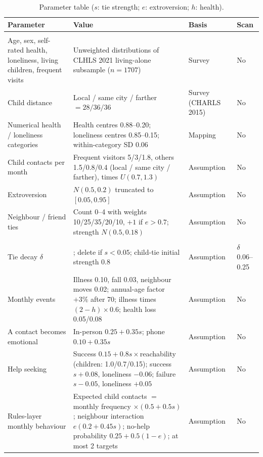 \documentclass[10pt,twocolumn]{article}
\begin{document}
\begin{table}[t]
\centering\footnotesize
\caption{Parameter table ($s$: tie strength; $e$: extroversion; $h$: health).}
\label{tab:params}
\setlength{\tabcolsep}{4pt}
\begin{tabular}{@{}>{\raggedright\arraybackslash}p{}>{\raggedright\arraybackslash}p{}>{\raggedright\arraybackslash}p{}>{\raggedright\arraybackslash}p{}@{}}
\toprule
Parameter & Value & Basis & Scan \\
\midrule
\multicolumn{4}{@{}l}{\textit{Profile generation}} \\
Age, sex, self-rated health, loneliness, living children, frequent visits & Unweighted distributions of CLHLS 2021 living-alone subsample ($n=1707$) & Survey & No \\
Child distance & Local / same city / farther $=28/36/36$ & Survey (CHARLS 2015) & No \\
Numerical health / loneliness categories & Health centres 0.88--0.20; loneliness centres 0.85--0.15; within-category SD 0.06 & Mapping & No \\
Child contacts per month & Frequent visitors 5/3/1.8, others 1.5/0.8/0.4 (local / same city / farther), times $U(0.7,1.3)$ & Assumption & No \\
Extroversion & $N(0.5,0.2)$ truncated to $[0.05,0.95]$ & Assumption & No \\
Neighbour / friend ties & Count 0--4 with weights 10/25/35/20/10, $+1$ if $e>0.7$; strength $N(0.5,0.18)$ & Assumption & No \\
\midrule
\multicolumn{4}{@{}l}{\textit{Environment dynamics}} \\
Tie decay $\delta$ & 0.06; delete if $s<0.05$; child-tie initial strength 0.8 & Assumption & $\delta$ 0.06--0.25 \\
Monthly events & Illness 0.10, fall 0.03, neighbour moves 0.02; annual-age factor $+3\%$ after 70; illness times $(2-h)\times0.6$; health loss 0.05/0.08 & Assumption & No \\
A contact becomes emotional & In-person $0.25+0.35s$; phone $0.10+0.35s$ & Assumption & No \\
Help seeking & Success $0.15+0.8s\times$reachability (children: 1.0/0.7/0.15); success $s{+}0.08$, loneliness $-0.06$; failure $s{-}0.05$, loneliness $+0.05$ & Assumption & No \\
Rules-layer monthly behaviour & Expected child contacts $=$ monthly frequency $\times(0.5+0.5s)$; neighbour interaction $e(0.2+0.45s)$; no-help probability $0.25+0.5(1-e)$; at most 2 targets & Assumption & No \\

\end{tabular}
\end{table}
\end{document}
